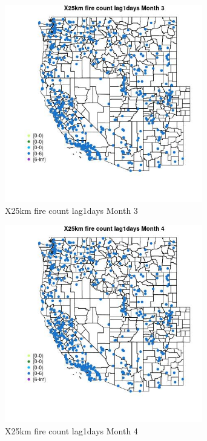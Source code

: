 \begin{figure} 
\centering  
\includegraphics[width=0.77\textwidth]{Code_Outputs/Report_ML_input_PM25_Step4_part_e_de_duplicated_aves_compiled_2019-05-14wNAs_MapObsMo3X25km_fire_count_lag1days.jpg} 
\caption{\label{fig:Report_ML_input_PM25_Step4_part_e_de_duplicated_aves_compiled_2019-05-14wNAsMapObsMo3X25km_fire_count_lag1days}X25km fire count lag1days Month 3} 
\end{figure} 
 

\begin{figure} 
\centering  
\includegraphics[width=0.77\textwidth]{Code_Outputs/Report_ML_input_PM25_Step4_part_e_de_duplicated_aves_compiled_2019-05-14wNAs_MapObsMo4X25km_fire_count_lag1days.jpg} 
\caption{\label{fig:Report_ML_input_PM25_Step4_part_e_de_duplicated_aves_compiled_2019-05-14wNAsMapObsMo4X25km_fire_count_lag1days}X25km fire count lag1days Month 4} 
\end{figure} 
 

